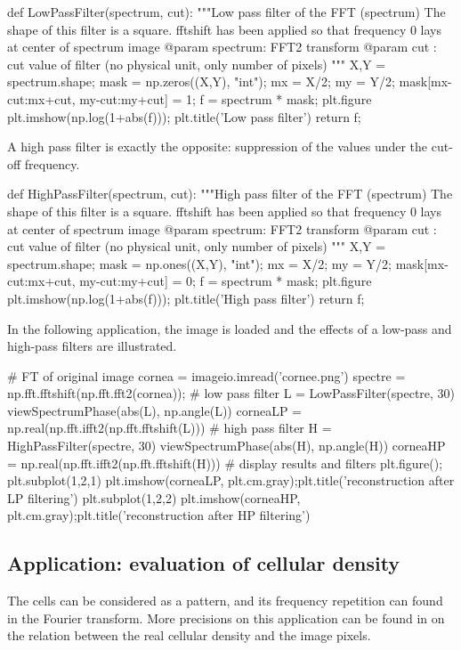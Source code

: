  \begin{python} 
def LowPassFilter(spectrum, cut):
    """Low pass filter of the FFT (spectrum)
    The shape of this filter is a square. fftshift has been applied so that 
    frequency 0 lays at center of spectrum image
    @param spectrum: FFT2 transform
    @param cut     : cut value of filter (no physical unit, only number of pixels)
    """
    X,Y = spectrum.shape;
    mask = np.zeros((X,Y), "int");
    mx = X/2; my = Y/2;
    mask[mx-cut:mx+cut, my-cut:my+cut] = 1;
    f = spectrum * mask;
    plt.figure
    plt.imshow(np.log(1+abs(f))); 
    plt.title('Low pass filter')
    return f;
\end{python}

A high pass filter is exactly the opposite: suppression of the values under the cut-off frequency.
\begin{python}
def HighPassFilter(spectrum, cut):
    """High pass filter of the FFT (spectrum)
    The shape of this filter is a square. fftshift has been applied so that 
    frequency 0 lays at center of spectrum image
    @param spectrum: FFT2 transform
    @param cut     : cut value of filter (no physical unit, only number of pixels)
    """
    X,Y = spectrum.shape;
    mask = np.ones((X,Y), "int");
    mx = X/2; my = Y/2;
    mask[mx-cut:mx+cut, my-cut:my+cut] = 0;
    f = spectrum * mask;
    plt.figure
    plt.imshow(np.log(1+abs(f))); 
    plt.title('High pass filter')
    return f;
\end{python}


In the following application, the image is loaded and the effects of a low-pass and high-pass filters are illustrated.
\begin{python}
# FT of original image
cornea = imageio.imread('cornee.png')
spectre = np.fft.fftshift(np.fft.fft2(cornea));
# low pass filter
L = LowPassFilter(spectre, 30)
viewSpectrumPhase(abs(L), np.angle(L))
corneaLP = np.real(np.fft.ifft2(np.fft.fftshift(L)))
# high pass filter
H = HighPassFilter(spectre, 30)
viewSpectrumPhase(abs(H), np.angle(H))
corneaHP = np.real(np.fft.ifft2(np.fft.fftshift(H)))
# display results and filters
plt.figure();
plt.subplot(1,2,1)
plt.imshow(corneaLP, plt.cm.gray);plt.title('reconstruction after LP filtering')
plt.subplot(1,2,2)
plt.imshow(corneaHP, plt.cm.gray);plt.title('reconstruction after HP filtering')
 \end{python}
 
\vspace*{-5pt}
\subsection{Application: evaluation of cellular density}
The cells can be considered as a pattern, and its frequency repetition can found in the Fourier transform. More precisions on this application can be found in \cite{Ruggeri2005,Grisan2005,Ruggeri2007,Selig2015} on the relation between the real cellular density and the image pixels.

